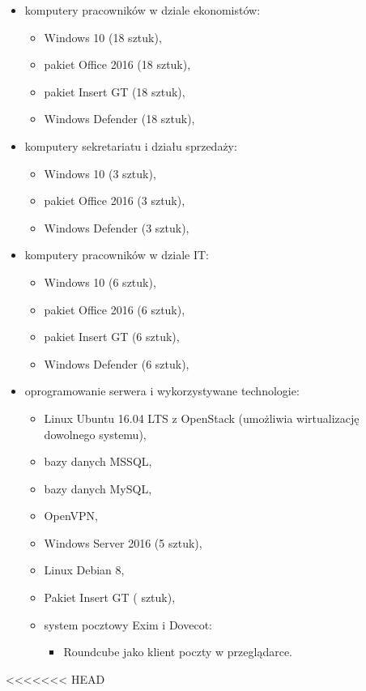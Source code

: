 \begin{minipage}[\right]{15cm}
\begin{itemize}
	\item komputery pracowników w dziale ekonomistów:
	\begin{itemize}
		\item Windows 10 (18 sztuk),
		\item pakiet Office 2016 (18 sztuk),
		\item pakiet Insert GT (18 sztuk),
		\item Windows Defender (18 sztuk),
	\end{itemize}
	\item komputery sekretariatu i działu sprzedaży:
	\begin{itemize}
		\item Windows 10 (3 sztuk),
		\item pakiet Office 2016 (3 sztuk),
		\item Windows Defender (3 sztuk),
	\end{itemize}
	\item komputery pracowników w dziale IT:
	\begin{itemize}
		\item Windows 10 (6 sztuk),
		\item pakiet Office 2016 (6 sztuk),
		\item pakiet Insert GT (6 sztuk),
		\item Windows Defender (6 sztuk),
	\end{itemize}
	\item oprogramowanie serwera i wykorzystywane technologie:
	\begin{itemize}
		\item Linux Ubuntu 16.04 LTS z OpenStack (umożliwia wirtualizację
		\linebreak dowolnego systemu),
		\item bazy danych MSSQL,
		\item bazy danych MySQL,
		\item OpenVPN,
		\item Windows Server 2016 (5 sztuk),
		\item Linux Debian 8,
		\item Pakiet Insert GT ( sztuk),
		\item system pocztowy Exim i Dovecot:
		\begin{itemize}
			\item Roundcube jako klient poczty w przeglądarce.
		\end{itemize}
	\end{itemize}
\end{itemize}
<<<<<<< HEAD
\end{minipage}

